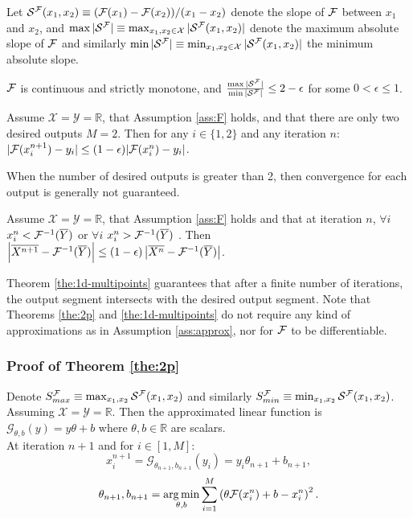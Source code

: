\documentclass[nohyperref]{article}
\begin{document}
Let $\mathcal{S}^{\mathcal{F}}(x_1,x_2)\equiv(\mathcal{F}(x_1)-\mathcal{F}(x_2))/(x_1-x_2)$ denote the slope of $\mathcal{F}$ between $x_1$ and $x_2$, and $\max |\mathcal{S}^{\mathcal{F}}|\equiv \max_{x_1,x_2\in\mathcal{X}} |\mathcal{S}^{\mathcal{F}}(x_1,x_2)|$ denote the maximum absolute slope of $\mathcal{F}$ and similarly $\min |\mathcal{S}^{\mathcal{F}}|\equiv \min_{x_1,x_2\in\mathcal{X}} |\mathcal{S}^{\mathcal{F}}(x_1,x_2)|$ the minimum absolute slope.
\begin{assumption}\label{ass:F}
 $\mathcal{F}$ is continuous and strictly monotone, and $\frac{\max |\mathcal{S}^{\mathcal{F}}|}{\min |\mathcal{S}^{\mathcal{F}}|}\leq 2-\epsilon$ for some $0<\epsilon\leq 1$.
\end{assumption}
\begin{theorem}\label{the:2p}
    Assume $\mathcal{X}=\mathcal{Y}=\mathbb{R}$, that Assumption \ref{ass:F} holds, and that there are only two desired outputs $M=2$. Then for any $i\in \{1,2\}$ and any iteration $n$: $|\mathcal{F}(x_i^{n+1})-y_i|\leq(1-\epsilon)|\mathcal{F}(x_i^{n})-y_i|$.
\end{theorem}
When the number of desired outputs is greater than 2, then convergence for each output is generally not guaranteed.
\begin{theorem}\label{the:1d-multipoints}
        Assume $\mathcal{X}=\mathcal{Y}=\mathbb{R}$, that Assumption \ref{ass:F} holds and that at iteration $n$, $\forall i$ $x_i^n<\mathcal{F}^{-1}(\overline{Y})$ or $\forall i$ $x_i^n>\mathcal{F}^{-1}(\overline{Y})$ . Then $\left|\overline{X^{n+1}}-\mathcal{F}^{-1}(\overline{Y})\right|\leq(1-\epsilon)\left|\overline{X^n}-\mathcal{F}^{-1}(\overline{Y})\right|$.
\end{theorem}
Theorem \ref{the:1d-multipoints} guarantees that after a finite number of iterations, the output segment intersects with the desired output segment. Note that Theorems \ref{the:2p} and \ref{the:1d-multipoints} do not require any kind of approximations as in Assumption \ref{ass:approx}, nor for $\mathcal{F}$ to be differentiable. 

\subsubsection{Proof of Theorem \ref{the:2p}}\label{app:2d}
Denote $S_{max}^{\mathcal{F}} \equiv \max_{x_1,x_2} \mathcal{S}^{\mathcal{F}} (x_1,x_2)$ and similarly $S_{min}^{\mathcal{F}} \equiv \min_{x_1,x_2} \mathcal{S}^{\mathcal{F}} (x_1,x_2)$.\\

Assuming $\mathcal{X}=\mathcal{Y}=\mathbb{R}$. Then the approximated linear function is $\mathcal{G}_{\theta,b}(y)=y\theta + b$ where $\theta,b\in\mathbb{R}$ are scalars.\\
At iteration $n+1$ and for $i\in[1,M]$:
\begin{equation}\label{eq:x_i-1d}
    x_i^{n+1} = \mathcal{G}_{\theta_{n+1},b_{n+1}}(y_i)=y_i\theta_{n+1}+b_{n+1},
\end{equation}
\begin{align*}
    \theta_{n+1}, b_{n+1} = \operatorname*{arg\,min}_{\theta, b} \sum_{i=1}^M \left(\theta \mathcal{F}(x_i^n)+b - x_i^n\right)^2.
\end{align*}
\end{document}
